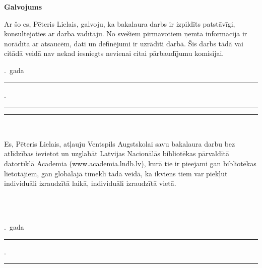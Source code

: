 \begin{center}
	\Large\bfseries Galvojums
\end{center}

Ar šo es, Pēteris Lielais, galvoju,                     %
ka bakalaura darbs ir izpildīts patstāvīgi,
konsultējoties ar darba vadītāju. No svešiem pirmavotiem ņemtā informācija
ir norādīta ar atsaucēm, dati un definējumi ir uzrādīti darbā.
Šis darbs tādā vai citādā veidā nav nekad iesniegts nevienai
citai pārbaudījumu komisijai.

\vspace{3cm}
\noindent
\begin{minipage}{\textwidth}
	\raggedright
	\the\year{}.~gada                %
	\rule[-2pt]{2em}{0.3pt}.~\rule[-2pt]{10em}{0.3pt}
	\hfill
	\rule[-2pt]{10em}{0.3pt}\\[-1ex]
	\hfill{}
\end{minipage}

\vspace{3cm}
Es, Pēteris Lielais, atļauju Ventspils Augstskolai      %
savu bakalaura darbu
bez atlīdzības ievietot un uzglabāt Latvijas Nacionālās bibliotēkas
pārvaldītā datortīklā Academia (www.academia.lndb.lv), kurā tie ir
pieejami gan bibliotēkas lietotājiem, gan globālajā tīmeklī tādā veidā,
ka ikviens tiem var piekļūt individuāli izraudzītā laikā, individuāli
izraudzītā vietā.\\[1cm]
\begin{flushright}
	\\[1cm]
	\\[1cm]
\end{flushright}
\the\year{}.~gada                    %
\rule[-2pt]{2em}{0.3pt}.~\rule[-2pt]{10em}{0.3pt}
